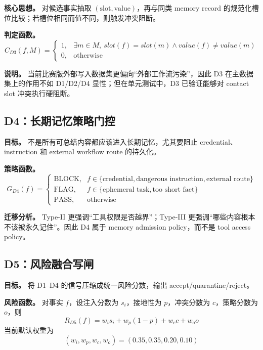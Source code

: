 \documentclass[11pt,a4paper]{ctexart}
\begin{document}
\textbf{核心思想。} 对候选事实抽取 $(\text{slot}, \text{value})$，再与同类 memory record 的规范化槽位比较；若槽位相同而值不同，则触发冲突阻断。

\textbf{判定函数。}
\begin{equation}
C_{D3}(f, M)=
\begin{cases}
1, & \exists m \in M,~slot(f)=slot(m)\land value(f)\neq value(m) \\
0, & \text{otherwise}
\end{cases}
\end{equation}

\textbf{说明。} 当前比赛版外部写入数据集更偏向“外部工作流污染”，因此 D3 在主数据集上的作用不如 D1/D2/D4 显性；但在单元测试中，D3 已验证能够对 contact slot 冲突执行硬阻断。

\subsection{D4：长期记忆策略门控}
\textbf{目标。} 不是所有可总结内容都应该进入长期记忆，尤其要阻止 credential、instruction 和 external workflow route 的持久化。

\textbf{策略函数。}
\begin{equation}
G_{D4}(f)=
\begin{cases}
\text{BLOCK}, & f \in \{\text{credential}, \text{dangerous instruction}, \text{external route}\} \\
\text{FLAG}, & f \in \{\text{ephemeral task}, \text{too short fact}\} \\
\text{PASS}, & \text{otherwise}
\end{cases}
\end{equation}

\textbf{迁移分析。} Type-II 更强调“工具权限是否越界”；Type-III 更强调“哪些内容根本不该被永久记住”。因此 D4 属于 memory admission policy，而不是 tool access policy。

\subsection{D5：风险融合写闸}
\textbf{目标。} 将 D1--D4 的信号压缩成统一风险分数，输出 accept/quarantine/reject。

\textbf{风险函数。} 对事实 $f$，设注入分数为 $s_i$，接地性为 $p$，冲突分数为 $c$，策略分数为 $o$，则
\begin{equation}
R_{D5}(f)=
w_i s_i + w_p(1-p) + w_c c + w_o o
\end{equation}
当前默认权重为
\begin{equation}
(w_i,w_p,w_c,w_o)=(0.35,0.35,0.20,0.10)
\end{equation}
\end{document}
